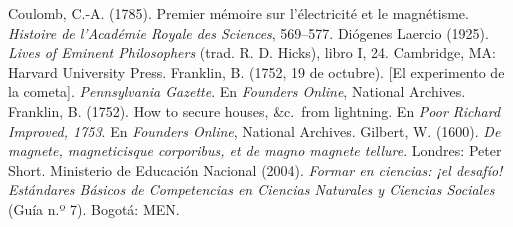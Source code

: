 \documentclass[11pt]{article}
\begin{document}
\begin{referencias}
 Coulomb, C.-A. (1785). Premier mémoire sur l'électricité
  et le magnétisme. \emph{Histoire de l'Académie Royale des Sciences},
  569--577.
 Diógenes Laercio (1925). \emph{Lives of Eminent
  Philosophers} (trad. R. D. Hicks), libro I, 24. Cambridge, MA: Harvard
  University Press.
 Franklin, B. (1752, 19 de octubre). [El experimento de
  la cometa]. \emph{Pennsylvania Gazette}. En \emph{Founders Online},
  National Archives.
 Franklin, B. (1752). How to secure houses, \&c.\ from
  lightning. En \emph{Poor Richard Improved, 1753}. En \emph{Founders Online},
  National Archives.
 Gilbert, W. (1600). \emph{De magnete, magneticisque
  corporibus, et de magno magnete tellure}. Londres: Peter Short.
 Ministerio de Educación Nacional (2004).
  \emph{Formar en ciencias: ¡el desafío! Estándares Básicos de Competencias en
  Ciencias Naturales y Ciencias Sociales} (Guía n.º 7). Bogotá: MEN.

\end{referencias}
\end{document}

